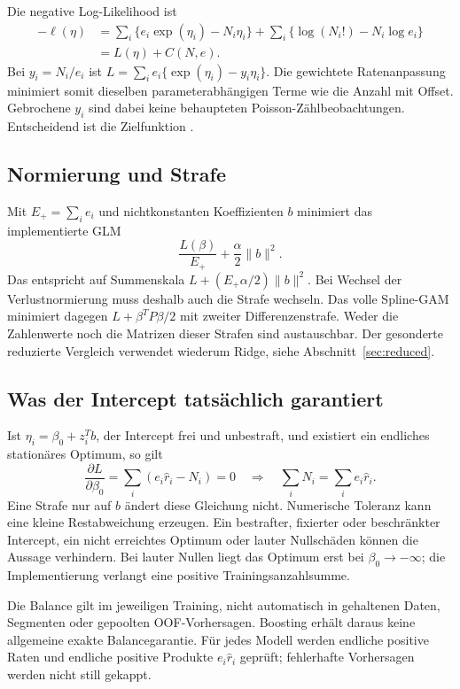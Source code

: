 \documentclass[11pt,a4paper]{article}
\begin{document}
Die negative Log-Likelihood ist
\begin{align}
 -\ell(\eta)&=\sum_i\{e_i\exp(\eta_i)-N_i\eta_i\}
              +\sum_i\{\log(N_i!)-N_i\log e_i\} \\
            &=L(\eta)+C(N,e).
\end{align}
Bei $y_i=N_i/e_i$ ist $L=\sum_i e_i\{\exp(\eta_i)-y_i\eta_i\}$. Die gewichtete Ratenanpassung minimiert somit dieselben parameterabhängigen Terme wie die Anzahl mit Offset. Gebrochene $y_i$ sind dabei keine behaupteten Poisson-Zählbeobachtungen. Entscheidend ist die Zielfunktion \cite{glm}.

\subsection*{Normierung und Strafe}
Mit $E_+=\sum_i e_i$ und nichtkonstanten Koeffizienten $b$ minimiert das implementierte GLM
\begin{equation}\label{eq:ridge}
 \frac{L(\beta)}{E_+}+\frac{\alpha}{2}\|b\|^2.
\end{equation}
Das entspricht auf Summenskala $L+(E_+\alpha/2)\|b\|^2$. Bei Wechsel der Verlustnormierung muss deshalb auch die Strafe wechseln. Das volle Spline-GAM minimiert dagegen $L+\beta^TP\beta/2$ mit zweiter Differenzenstrafe. Weder die Zahlenwerte noch die Matrizen dieser Strafen sind austauschbar. Der gesonderte reduzierte Vergleich verwendet wiederum Ridge, siehe Abschnitt~\ref{sec:reduced}.

\subsection*{Was der Intercept tatsächlich garantiert}
Ist $\eta_i=\beta_0+z_i^Tb$, der Intercept frei und unbestraft, und existiert ein endliches stationäres Optimum, so gilt
\begin{equation}
 \frac{\partial L}{\partial\beta_0}=\sum_i(e_i\widehat r_i-N_i)=0
 \quad\Longrightarrow\quad \sum_iN_i=\sum_ie_i\widehat r_i.
\end{equation}
Eine Strafe nur auf $b$ ändert diese Gleichung nicht. Numerische Toleranz kann eine kleine Restabweichung erzeugen. Ein bestrafter, fixierter oder beschränkter Intercept, ein nicht erreichtes Optimum oder lauter Nullschäden können die Aussage verhindern. Bei lauter Nullen liegt das Optimum erst bei $\beta_0\to-\infty$; die Implementierung verlangt eine positive Trainingsanzahlsumme.

Die Balance gilt im jeweiligen Training, nicht automatisch in gehaltenen Daten, Segmenten oder gepoolten OOF-Vorhersagen. Boosting erhält daraus keine allgemeine exakte Balancegarantie. Für jedes Modell werden endliche positive Raten und endliche positive Produkte $e_i\widehat r_i$ geprüft; fehlerhafte Vorhersagen werden nicht still gekappt.
\end{document}
